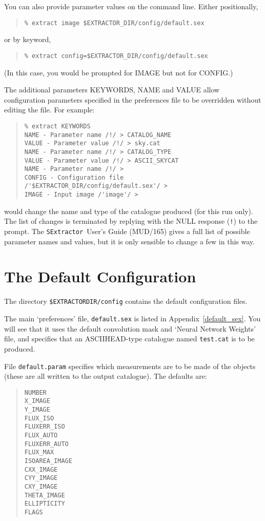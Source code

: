 \documentclass[twoside,11pt]{article}
\newcommand{\htmladdnormallink}[2]{#1}
\newcommand{\latex}[1]{#1}
\newcommand{\xlabel}[1]{}
\renewcommand{\_}{\texttt{\symbol{95}}}
\newcommand{\SExtractor}{\texttt{SExtractor}}
\newcommand{\MUD}{mud165.ps}
\begin{document}
You can also provide parameter values on the command line.
Either positionally,
\begin{quote} \begin{verbatim}
% extract image $EXTRACTOR_DIR/config/default.sex
\end{verbatim} \end{quote}
or by keyword,
\begin{quote} \begin{verbatim}
% extract config=$EXTRACTOR_DIR/config/default.sex
\end{verbatim} \end{quote}
(In this case, you would be prompted for IMAGE but not for CONFIG.)

The additional parameters KEYWORDS, NAME and VALUE allow
configuration parameters specified in the preferences file to be overridden
without editing the file. For example:
\begin{quote} \begin{verbatim}
% extract KEYWORDS
NAME - Parameter name /!/ > CATALOG_NAME
VALUE - Parameter value /!/ > sky.cat
NAME - Parameter name /!/ > CATALOG_TYPE
VALUE - Parameter value /!/ > ASCII_SKYCAT
NAME - Parameter name /!/ >
CONFIG - Configuration file /'$EXTRACTOR_DIR/config/default.sex'/ >
IMAGE - Input image /'image'/ >
\end{verbatim} \end{quote}
would change the name and type of the catalogue produced (for this
run only). The list of changes is terminated by replying with the NULL
response (\texttt{!}) to the prompt.
The
\htmladdnormallink{\SExtractor\ User's Guide}{\MUD}\latex{ (MUD/165)}
gives a full list of possible parameter names and values, but it is only
sensible to change a few in this way.

\section{\xlabel{the_default_configuration}\label{defaults}\xlabel{defaults}The Default Configuration}

The directory \texttt{\$EXTRACTOR\_DIR/config} contains the default
configuration files.

The main `preferences' file, \texttt{default.sex} is listed in
Appendix~\ref{default_sex}.
You will see that it uses the default convolution mask and `Neural Network
Weights' file, and specifies that an ASCII\_HEAD-type catalogue named
\texttt{test.cat} is to be produced.

File \texttt{default.param} specifies which measurements are to be
made of the objects (these are all written to the output
catalogue). The defaults are:
\begin{quote}\begin{verbatim}
NUMBER
X_IMAGE
Y_IMAGE
FLUX_ISO
FLUXERR_ISO
FLUX_AUTO
FLUXERR_AUTO
FLUX_MAX
ISOAREA_IMAGE
CXX_IMAGE
CYY_IMAGE
CXY_IMAGE
THETA_IMAGE
ELLIPTICITY
FLAGS
\end{verbatim}\end{quote}
\end{document}
